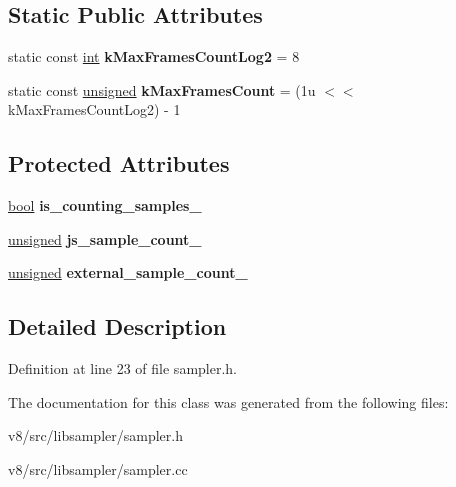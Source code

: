 \subsection*{Static Public Attributes}
\begin{DoxyCompactItemize}
\item 
\mbox{\label{classv8_1_1sampler_1_1Sampler_ad2852f03473f07a6d90a189aef0a96e9}} 
static const \mbox{\hyperlink{classint}{int}} {\bfseries k\+Max\+Frames\+Count\+Log2} = 8
\item 
\mbox{\label{classv8_1_1sampler_1_1Sampler_a160867f43b86d3029b231734cd432f99}} 
static const \mbox{\hyperlink{classunsigned}{unsigned}} {\bfseries k\+Max\+Frames\+Count} = (1u $<$$<$ k\+Max\+Frames\+Count\+Log2) -\/ 1
\end{DoxyCompactItemize}
\subsection*{Protected Attributes}
\begin{DoxyCompactItemize}
\item 
\mbox{\label{classv8_1_1sampler_1_1Sampler_a9c32fc8d9c423d4f2d4232de0378cd6e}} 
\mbox{\hyperlink{classbool}{bool}} {\bfseries is\+\_\+counting\+\_\+samples\+\_\+}
\item 
\mbox{\label{classv8_1_1sampler_1_1Sampler_ac9ce4fdf7ce265479fdefa9dad30593c}} 
\mbox{\hyperlink{classunsigned}{unsigned}} {\bfseries js\+\_\+sample\+\_\+count\+\_\+}
\item 
\mbox{\label{classv8_1_1sampler_1_1Sampler_adc4f82663ce04a5c29b8510db93b7198}} 
\mbox{\hyperlink{classunsigned}{unsigned}} {\bfseries external\+\_\+sample\+\_\+count\+\_\+}
\end{DoxyCompactItemize}


\subsection{Detailed Description}


Definition at line 23 of file sampler.\+h.



The documentation for this class was generated from the following files\+:\begin{DoxyCompactItemize}
\item 
v8/src/libsampler/sampler.\+h\item 
v8/src/libsampler/sampler.\+cc\end{DoxyCompactItemize}
